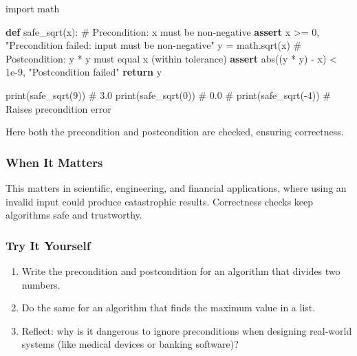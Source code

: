\documentclass[
  letterpaper,
  DIV=11,
  numbers=noendperiod]{scrreprt}
\newenvironment{Shaded}{\begin{snugshade}}{\end{snugshade}}
\newcommand{\BuiltInTok}[1]{\textcolor[rgb]{0.00,0.23,0.31}{#1}}
\newcommand{\CommentTok}[1]{\textcolor[rgb]{0.37,0.37,0.37}{#1}}
\newcommand{\ControlFlowTok}[1]{\textcolor[rgb]{0.00,0.23,0.31}{\textbf{#1}}}
\newcommand{\DecValTok}[1]{\textcolor[rgb]{0.68,0.00,0.00}{#1}}
\newcommand{\FloatTok}[1]{\textcolor[rgb]{0.68,0.00,0.00}{#1}}
\newcommand{\ImportTok}[1]{\textcolor[rgb]{0.00,0.46,0.62}{#1}}
\newcommand{\KeywordTok}[1]{\textcolor[rgb]{0.00,0.23,0.31}{\textbf{#1}}}
\newcommand{\NormalTok}[1]{\textcolor[rgb]{0.00,0.23,0.31}{#1}}
\newcommand{\OperatorTok}[1]{\textcolor[rgb]{0.37,0.37,0.37}{#1}}
\newcommand{\StringTok}[1]{\textcolor[rgb]{0.13,0.47,0.30}{#1}}
\providecommand{\tightlist}{%
  \setlength{\itemsep}{0pt}\setlength{\parskip}{0pt}}
\begin{document}
\begin{Shaded}
\begin{Highlighting}[]
\ImportTok{import}\NormalTok{ math}

\KeywordTok{def}\NormalTok{ safe\_sqrt(x):}
    \CommentTok{\# Precondition: x must be non{-}negative}
    \ControlFlowTok{assert}\NormalTok{ x }\OperatorTok{\textgreater{}=} \DecValTok{0}\NormalTok{, }\StringTok{"Precondition failed: input must be non{-}negative"}
\NormalTok{    y }\OperatorTok{=}\NormalTok{ math.sqrt(x)}
    \CommentTok{\# Postcondition: y * y must equal x (within tolerance)}
    \ControlFlowTok{assert} \BuiltInTok{abs}\NormalTok{((y }\OperatorTok{*}\NormalTok{ y) }\OperatorTok{{-}}\NormalTok{ x) }\OperatorTok{\textless{}} \FloatTok{1e{-}9}\NormalTok{, }\StringTok{"Postcondition failed"}
    \ControlFlowTok{return}\NormalTok{ y}

\BuiltInTok{print}\NormalTok{(safe\_sqrt(}\DecValTok{9}\NormalTok{))   }\CommentTok{\# 3.0}
\BuiltInTok{print}\NormalTok{(safe\_sqrt(}\DecValTok{0}\NormalTok{))   }\CommentTok{\# 0.0}
\CommentTok{\# print(safe\_sqrt({-}4))  \# Raises precondition error}
\end{Highlighting}
\end{Shaded}

Here both the precondition and postcondition are checked, ensuring
correctness.

\subsubsection{When It Matters}\label{when-it-matters-61}

This matters in scientific, engineering, and financial applications,
where using an invalid input could produce catastrophic results.
Correctness checks keep algorithms safe and trustworthy.

\subsubsection{Try It Yourself}\label{try-it-yourself-63}

\begin{enumerate}
\def\labelenumi{\arabic{enumi}.}
\tightlist
\item
  Write the precondition and postcondition for an algorithm that divides
  two numbers.
\item
  Do the same for an algorithm that finds the maximum value in a list.
\item
  Reflect: why is it dangerous to ignore preconditions when designing
  real-world systems (like medical devices or banking software)?
\end{enumerate}
\end{document}
